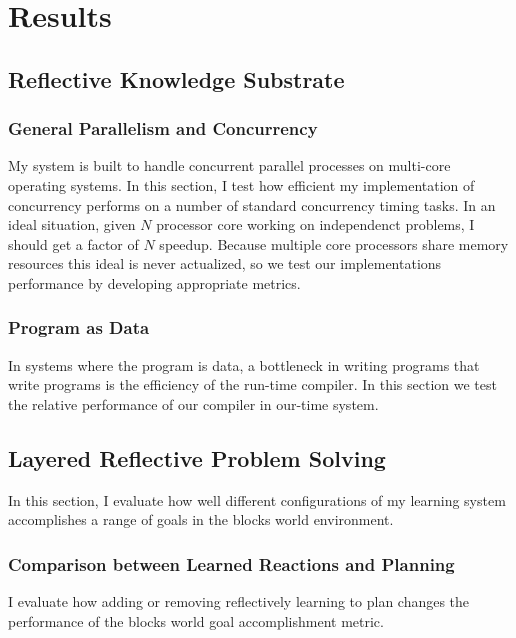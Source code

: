 \chapter{Results}\label{ch:results}


\section{Reflective Knowledge Substrate}


\subsection{General Parallelism and Concurrency}

My system is built to handle concurrent parallel processes on
multi-core operating systems.  In this section, I test how efficient
my implementation of concurrency performs on a number of standard
concurrency timing tasks.  In an ideal situation, given $N$ processor
core working on independenct problems, I should get a factor of $N$
speedup.  Because multiple core processors share memory resources this
ideal is never actualized, so we test our implementations performance
by developing appropriate metrics.

\subsection{Program as Data}

In systems where the program is data, a bottleneck in writing programs
that write programs is the efficiency of the run-time compiler.  In
this section we test the relative performance of our compiler in
our-time system.

\section{Layered Reflective Problem Solving}

In this section, I evaluate how well different configurations of my
learning system accomplishes a range of goals in the blocks world
environment.

\subsection{Comparison between Learned Reactions and Planning}

I evaluate how adding or removing reflectively learning to plan
changes the performance of the blocks world goal accomplishment
metric.

